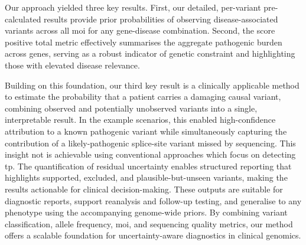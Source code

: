 Our approach yielded three key results. First, our detailed, per-variant pre-calculated results provide prior probabilities of observing disease-associated variants across all \ac{moi} for any gene-disease combination. Second, the score positive total metric effectively summarises the aggregate pathogenic burden across genes, serving as a robust indicator of genetic constraint and highlighting those with elevated disease relevance.

Building on this foundation, our third key result is a clinically applicable method to estimate the probability that a patient carries a damaging causal variant, combining observed and potentially unobserved variants into a single, interpretable result.
In the example scenarios, this enabled high-confidence attribution to a known pathogenic variant while simultaneously capturing the contribution of a likely-pathogenic splice-site variant missed by sequencing.
This insight not is achievable using conventional approaches which focus on detecting \ac{tp}.
The quantification of residual uncertainty enables structured reporting that highlights supported, excluded, and plausible-but-unseen variants, making the results actionable for clinical decision-making. 
These outputs are suitable for diagnostic reports, support reanalysis and follow-up testing, and generalise to any phenotype using the accompanying genome-wide priors.
By combining variant classification, allele frequency, \ac{moi}, and sequencing quality metrics, our method offers a scalable foundation for uncertainty-aware diagnostics in clinical genomics.

